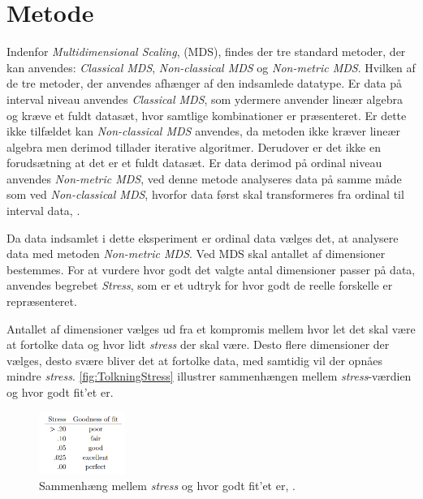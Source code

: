 \section*{Metode}
\label{Metode}
%
Indenfor \textit{Multidimensional Scaling}, (MDS), findes der tre standard metoder, der kan anvendes: \textit{Classical MDS}, \textit{Non-classical MDS} og \textit{Non-metric MDS}. Hvilken af de tre metoder, der anvendes afhænger af den indsamlede datatype. Er data på interval niveau anvendes \textit{Classical MDS}, som ydermere anvender lineær algebra og kræve et fuldt datasæt, hvor samtlige kombinationer er præsenteret. Er dette ikke tilfældet kan \textit{Non-classical MDS} anvendes, da metoden ikke kræver lineær algebra men derimod tillader iterative algoritmer. Derudover er det ikke en forudsætning at det er et fuldt datasæt. Er data derimod på ordinal niveau anvendes \textit{Non-metric MDS}, ved denne metode analyseres data på samme måde som ved \textit{Non-classical MDS}, hvorfor data først skal transformeres fra ordinal til interval data, \parencite[s. 9]{Wickelmaier2003}. 

Da data indsamlet i dette eksperiment er ordinal data vælges det, at analysere data med metoden \textit{Non-metric MDS}.\blankline
%
Ved MDS skal antallet af dimensioner bestemmes. For at vurdere hvor godt det valgte antal dimensioner passer på data, anvendes begrebet \textit{Stress}, som er et udtryk for hvor godt de reelle forskelle er repræsenteret.

Antallet af dimensioner vælges ud fra et kompromis mellem hvor let det skal være at fortolke data og hvor lidt \textit{stress} der skal være. Desto flere dimensioner der vælges, desto svære bliver det at fortolke data, med samtidig vil der opnåes mindre \textit{stress}. \autoref{fig:TolkningStress} illustrer sammenhængen mellem \textit{stress}-værdien og hvor godt fit'et er. 
%
\begin{figure}[H]
\centering
\includegraphics[width = 0.25\textwidth]{Figure/TolkningStress.PNG} 
\caption{Sammenhæng mellem \textit{stress} og hvor godt fit'et er, \parencite[p.13]{Wickelmaier2003}.}
\label{fig:TolkningStress}
\end{figure}	
%

